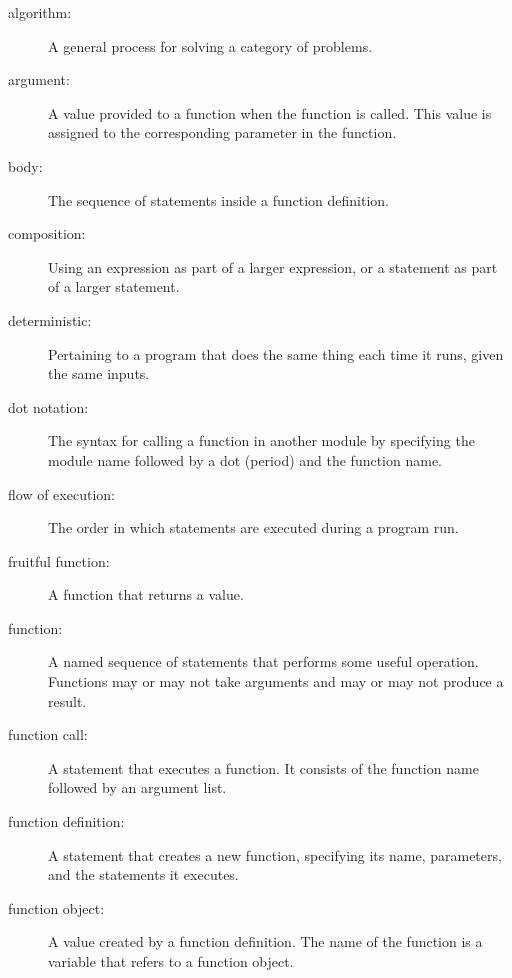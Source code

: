 \documentclass[10pt]{book}
\begin{document}
\begin{description}

\item[algorithm:]  A general process for solving a category of
problems.

\item[argument:]  A value provided to a function when the function is called.
This value is assigned to the corresponding parameter in the function.

\item[body:] The sequence of statements inside a function definition.

\item[composition:] Using an expression as part of a larger expression,
or a statement as part of a larger statement.

\item[deterministic:] Pertaining to a program that does the same
thing each time it runs, given the same inputs.

\item[dot notation:]  The syntax for calling a function in another
module by specifying the module name followed by a dot (period) and
the function name.

\item[flow of execution:]  The order in which statements are executed during
a program run.

\item[fruitful function:] A function that returns a value.

\item[function:] A named sequence of statements that performs some
useful operation.  Functions may or may not take arguments and may or
may not produce a result.

\item[function call:] A statement that executes a function. It
consists of the function name followed by an argument list.

\item[function definition:]  A statement that creates a new function,
specifying its name, parameters, and the statements it executes.

\item[function object:]  A value created by a function definition.
The name of the function is a variable that refers to a function
object.


\end{description}
\end{document}
